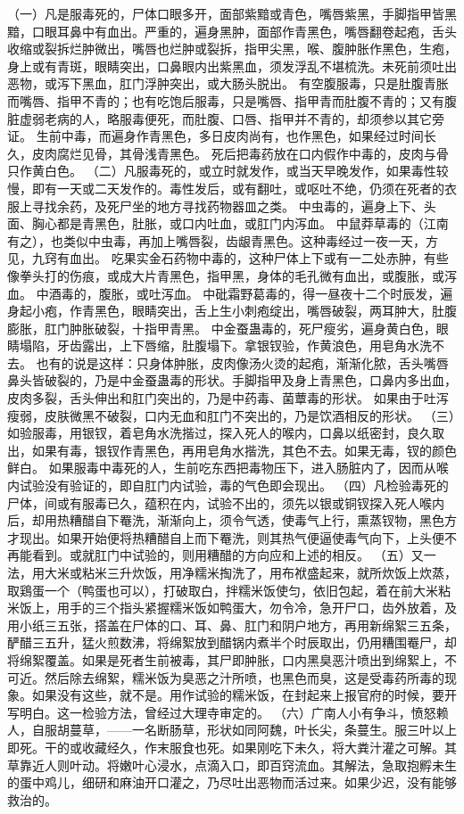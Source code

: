 \documentclass[12pt,UTF8]{ctexbook}
\begin{document}
（一）凡是服毒死的，尸体口眼多开，面部紫黯或青色，嘴唇紫黑，手脚指甲皆黑黯，口眼耳鼻中有血出。严重的，遍身黑肿，面部作青黑色，嘴唇翻卷起疱，舌头收缩或裂拆烂肿微出，嘴唇也烂肿或裂拆，指甲尖黑，喉、腹肿胀作黑色，生疱，身上或有青斑，眼睛突出，口鼻眼内出紫黑血，须发浮乱不堪梳洗。未死前须吐出恶物，或泻下黑血，肛门浮肿突出，或大肠头脱出。
有空腹服毒，只是肚腹青胀而嘴唇、指甲不青的；也有吃饱后服毒，只是嘴唇、指甲青而肚腹不青的；又有腹脏虚弱老病的人，略服毒便死，而肚腹、口唇、指甲并不青的，却须参以其它旁证。
生前中毒，而遍身作青黑色，多日皮肉尚有，也作黑色，如果经过时间长久，皮肉腐烂见骨，其骨浅青黑色。
死后把毒药放在口内假作中毒的，皮肉与骨只作黄白色。
（二）凡服毒死的，或立时就发作，或当天早晚发作，如果毒性较慢，即有一天或二天发作的。毒性发后，或有翻吐，或呕吐不绝，仍须在死者的衣服上寻找余药，及死尸坐的地方寻找药物器皿之类。
中虫毒的，遍身上下、头面、胸心都是青黑色，肚胀，或口内吐血，或肛门内泻血。
中鼠莽草毒的（江南有之），也类似中虫毒，再加上嘴唇裂，齿龈青黑色。这种毒经过一夜一天，方见，九窍有血出。
吃果实金石药物中毒的，这种尸体上下或有一二处赤肿，有些像拳头打的伤痕，或成大片青黑色，指甲黑，身体的毛孔微有血出，或腹胀，或泻血。
中酒毒的，腹胀，或吐泻血。
中砒霜野葛毒的，得一昼夜十二个时辰发，遍身起小疱，作青黑色，眼睛突出，舌上生小刺疱绽出，嘴唇破裂，两耳肿大，肚腹膨胀，肛门肿胀破裂，十指甲青黑。
中金蚕蛊毒的，死尸瘦劣，遍身黄白色，眼睛塌陷，牙齿露出，上下唇缩，肚腹塌下。拿银钗验，作黄浪色，用皂角水洗不去。
也有的说是这样：只身体肿胀，皮肉像汤火烫的起疱，渐渐化脓，舌头嘴唇鼻头皆破裂的，乃是中金蚕蛊毒的形状。手脚指甲及身上青黑色，口鼻内多出血，皮肉多裂，舌头伸出和肛门突出的，乃是中药毒、菌蕈毒的形状。
如果由于吐泻瘦弱，皮肤微黑不破裂，口内无血和肛门不突出的，乃是饮酒相反的形状。
（三）如验服毒，用银钗，着皂角水洗揩过，探入死人的喉内，口鼻以纸密封，良久取出，如果有毒，银钗作青黑色，再用皂角水揩洗，其色不去。如果无毒，钗的颜色鲜白。
如果服毒中毒死的人，生前吃东西把毒物压下，进入肠脏内了，因而从喉内试验没有验证的，即自肛门内试验，毒的气色即会现出。
（四）凡检验毒死的尸体，间或有服毒已久，蕴积在内，试验不出的，须先以银或铜钗探入死人喉内后，却用热糟醋自下罨洗，渐渐向上，须令气透，使毒气上行，熏蒸钗物，黑色方才现出。如果开始便将热糟醋自上而下罨洗，则其热气便逼使毒气向下，上头便不再能看到。或就肛门中试验的，则用糟醋的方向应和上述的相反。
（五）又一法，用大米或粘米三升炊饭，用净糯米掏洗了，用布袱盛起来，就所炊饭上炊蒸，取鶏蛋一个（鸭蛋也可以），打破取白，拌糯米饭使匀，依旧包起，着在前大米粘米饭上，用手的三个指头紧握糯米饭如鸭蛋大，勿令冷，急开尸口，齿外放着，及用小纸三五张，搭盖在尸体的口、耳、鼻、肛门和阴户地方，再用新绵絮三五条，酽醋三五升，猛火煎数沸，将绵絮放到醋锅内煮半个时辰取出，仍用糟围罨尸，却将绵絮覆盖。如果是死者生前被毒，其尸即肿胀，口内黑臭恶汁喷出到绵絮上，不可近。然后除去绵絮，糯米饭为臭恶之汁所喷，也黑色而臭，这是受毒药所毒的现象。如果没有这些，就不是。用作试验的糯米饭，在封起来上报官府的时候，要开写明白。这一检验方法，曾经过大理寺审定的。
（六）广南人小有争斗，愤怒赖人，自服胡蔓草，——一名断肠草，形状如同阿魏，叶长尖，条蔓生。服三叶以上即死。干的或收藏经久，作末服食也死。如果刚吃下未久，将大粪汁灌之可解。其草靠近人则叶动。将嫩叶心浸水，点滴入口，即百窍流血。其解法，急取抱孵未生的蛋中鸡儿，细研和麻油开口灌之，乃尽吐出恶物而活过来。如果少迟，没有能够救治的。
\end{document}
